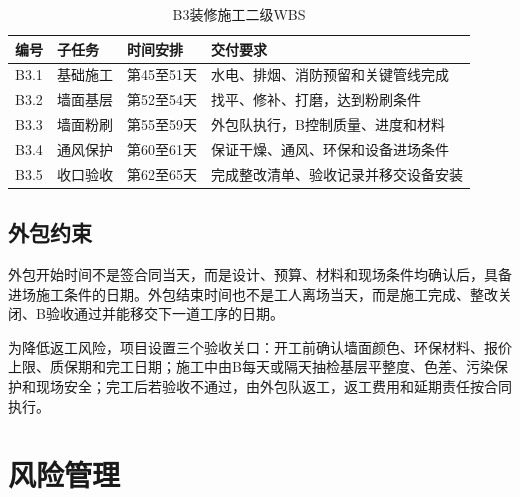 \documentclass[UTF8,zihao=-4]{ctexart}
\begin{document}
\begin{table}[H]
  \centering
  \caption{B3装修施工二级WBS}
  \begin{tabularx}{\textwidth}{p{2cm}p{3cm}p{3cm}Y}
    \toprule
    编号 & 子任务 & 时间安排 & 交付要求 \\
    \midrule
    B3.1 & 基础施工 & 第45至51天 & 水电、排烟、消防预留和关键管线完成 \\
    B3.2 & 墙面基层 & 第52至54天 & 找平、修补、打磨，达到粉刷条件 \\
    B3.3 & 墙面粉刷 & 第55至59天 & 外包队执行，B控制质量、进度和材料 \\
    B3.4 & 通风保护 & 第60至61天 & 保证干燥、通风、环保和设备进场条件 \\
    B3.5 & 收口验收 & 第62至65天 & 完成整改清单、验收记录并移交设备安装 \\
    \bottomrule
  \end{tabularx}
\end{table}

\subsection{外包约束}

外包开始时间不是签合同当天，而是设计、预算、材料和现场条件均确认后，具备进场施工条件的日期。外包结束时间也不是工人离场当天，而是施工完成、整改关闭、B验收通过并能移交下一道工序的日期。

为降低返工风险，项目设置三个验收关口：开工前确认墙面颜色、环保材料、报价上限、质保期和完工日期；施工中由B每天或隔天抽检基层平整度、色差、污染保护和现场安全；完工后若验收不通过，由外包队返工，返工费用和延期责任按合同执行。

\section{风险管理}
\end{document}
